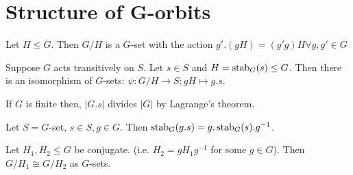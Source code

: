 \section{Structure of G-orbits}

\begin{proposition}
    Let \(H \leq G\). Then \(G / H\) is a \(G\)-set with the action \(g'.(gH) = (g'g)H \forall g, g' \in G\)
\end{proposition}

\begin{theorem} \label{structure-g-orbits}
    Suppose \(G\) acts transitively on \(S\). Let \(s \in S\) and \(H = \operatorname{stab}_G(s) \leq G\). Then there is an isomorphism of \(G\)-sets: \(\psi: G / H \to S; gH \mapsto g.s\).
\end{theorem}

\begin{corollary}
    If \(G\) is finite then, \(|G.s|\) divides \(|G|\) by Lagrange's theorem.
\end{corollary}

\begin{proposition}
    Let \(S = G\)-set, \(s \in S, g \in G\). Then \(\operatorname{stab}_G(g.s) = g.\operatorname{stab}_G(s).g^{-1}\).
\end{proposition}

\begin{corollary}
    Let \(H_1, H_2 \leq G\) be conjugate. (i.e. \(H_2 = gH_1g^{-1}\) for some \(g \in G\)). Then \(G / H_1 \cong G / H_2\) as \(G\)-sets.
\end{corollary}

